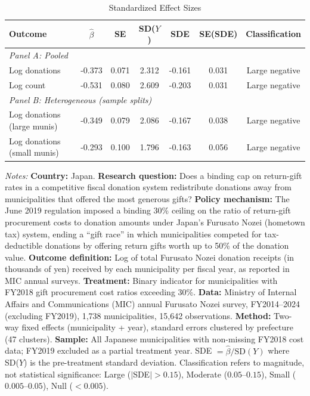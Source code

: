 \begin{table}[htbp]
\centering
\caption{Standardized Effect Sizes}
\label{tab:sde}
\begin{tabular}{lcccccc}
\hline\hline
Outcome & $\hat{\beta}$ & SE & SD($Y$) & SDE & SE(SDE) & Classification \\
\hline
\multicolumn{7}{l}{\textit{Panel A: Pooled}} \\
Log donations & -0.373 & 0.071 & 2.312 & -0.161 & 0.031 & Large negative \\
Log count & -0.531 & 0.080 & 2.609 & -0.203 & 0.031 & Large negative \\
\hline
\multicolumn{7}{l}{\textit{Panel B: Heterogeneous (sample splits)}} \\
Log donations (large munis) & -0.349 & 0.079 & 2.086 & -0.167 & 0.038 & Large negative \\
Log donations (small munis) & -0.293 & 0.100 & 1.796 & -0.163 & 0.056 & Large negative \\
\hline\hline
\end{tabular}
\begin{tablenotes}[flushleft]
\small
\item \textit{Notes:} \textbf{Country:} Japan. \textbf{Research question:} Does a binding cap on return-gift rates in a competitive fiscal donation system redistribute donations away from municipalities that offered the most generous gifts? \textbf{Policy mechanism:} The June 2019 regulation imposed a binding 30\% ceiling on the ratio of return-gift procurement costs to donation amounts under Japan's Furusato Nozei (hometown tax) system, ending a ``gift race'' in which municipalities competed for tax-deductible donations by offering return gifts worth up to 50\% of the donation value. \textbf{Outcome definition:} Log of total Furusato Nozei donation receipts (in thousands of yen) received by each municipality per fiscal year, as reported in MIC annual surveys. \textbf{Treatment:} Binary indicator for municipalities with FY2018 gift procurement cost ratios exceeding 30\%. \textbf{Data:} Ministry of Internal Affairs and Communications (MIC) annual Furusato Nozei survey, FY2014--2024 (excluding FY2019), 1,738 municipalities, 15,642 observations. \textbf{Method:} Two-way fixed effects (municipality + year), standard errors clustered by prefecture (47 clusters). \textbf{Sample:} All Japanese municipalities with non-missing FY2018 cost data; FY2019 excluded as a partial treatment year. SDE $= \hat{\beta} / \text{SD}(Y)$ where SD($Y$) is the pre-treatment standard deviation. Classification refers to magnitude, not statistical significance: Large ($|$SDE$| > 0.15$), Moderate ($0.05$--$0.15$), Small ($0.005$--$0.05$), Null ($< 0.005$).
\end{tablenotes}
\end{table}

